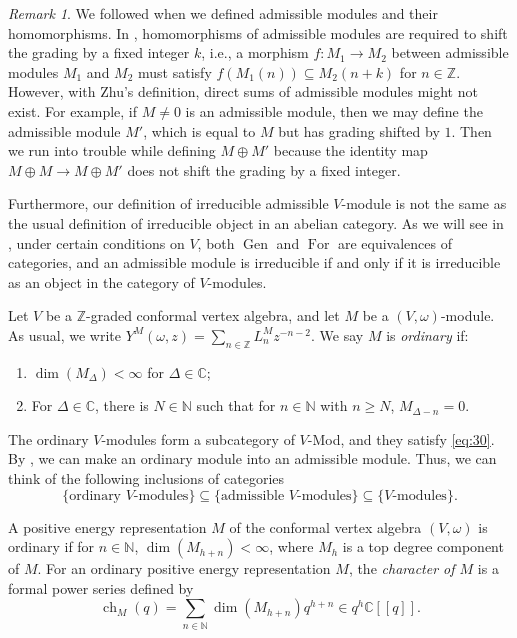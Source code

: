 \documentclass[a4paper, 12pt, reqno]{amsart}
\theoremstyle{remark}
\newtheorem{remark}[theorem]{Remark}
\DeclareMathOperator{\ch}{ch}
\DeclareMathOperator{\For}{For}
\DeclareMathOperator{\Gen}{Gen}
\begin{document}
\begin{remark}
  \label{rmk:26}
  We followed \cite{dong_twisted_1998} when we defined admissible modules and their homomorphisms.
  In \cite{zhu_modular_1996}, homomorphisms of admissible modules are required to shift the grading by a fixed integer $k$, i.e., a morphism $f: M_1 \to M_2$ between admissible modules $M_1$ and $M_2$ must satisfy $f(M_1(n)) \subseteq M_2(n + k)$ for $n \in \mathbb{Z}$.
  However, with Zhu's definition, direct sums of admissible modules might not exist.
  For example, if $M \neq 0$ is an admissible module, then we may define the admissible module $M'$, which is equal to $M$ but has grading shifted by $1$.
  Then we run into trouble while defining $M \oplus M'$ because the identity map $M \oplus M \to M \oplus M'$ does not shift the grading by a fixed integer.

  Furthermore, our definition of irreducible admissible $V$-module is not the same as the usual definition of irreducible object in an abelian category.
  As we will see in , under certain conditions on $V$, both $\Gen$ and $\For$ are equivalences of categories, and an admissible module is irreducible if and only if it is irreducible as an object in the category of $V$-modules.
\end{remark}

Let $V$ be a $\mathbb{Z}$-graded conformal vertex algebra, and let $M$ be a $(V, \omega)$-module.
As usual, we write $Y^M(\omega, z) = \sum_{n \in \mathbb{Z}}L^M_nz^{-n - 2}$.
We say $M$ is \emph{ordinary} if:
\begin{enumerate}
\item $\dim(M_{\Delta}) < \infty$ for $\Delta \in \mathbb{C}$;
\item For $\Delta \in \mathbb{C}$, there is $N \in \mathbb{N}$ such that for $n \in \mathbb{N}$ with $n \ge N$, $M_{\Delta - n} = 0$.
\end{enumerate}
The ordinary $V$-modules form a subcategory of $V$-Mod, and they satisfy \eqref{eq:30}.
By , we can make an ordinary module into an admissible module.
Thus, we can think of the following inclusions of categories
\begin{equation*}
  \{\text{ordinary $V$-modules}\} \subseteq \{\text{admissible $V$-modules}\} \subseteq \{\text{$V$-modules}\}.
\end{equation*}

A positive energy representation $M$ of the conformal vertex algebra $(V, \omega)$ is ordinary if for $n \in \mathbb{N}$, $\dim(M_{h + n}) < \infty$, where $M_h$ is a top degree component of $M$.
For an ordinary positive energy representation $M$, the \emph{character of $M$} is a formal power series defined by
\begin{equation*}
  \ch_M(q) = \sum_{n \in \mathbb{N}}\dim(M_{h + n})q^{h + n} \in q^h\mathbb{C}[[q]].
\end{equation*}
\end{document}
